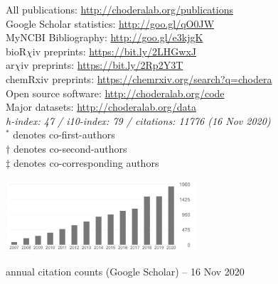 \documentclass[10pt]{article}
\begin{document}
\begin{minipage}[t]{3.2in}
All publications: \href{http://choderalab.org/publications}{http://choderalab.org/publications} \\
Google Scholar statistics: \href{http://goo.gl/qO0JW}{http://goo.gl/qO0JW} \hspace{0.2in} \\
MyNCBI Bibliography: \href{http://goo.gl/e3kjgK}{http://goo.gl/e3kjgK} \\
bioR$\chi$iv preprints: \href{https://bit.ly/2LHGwxJ}{https://bit.ly/2LHGwxJ} \\
ar$\chi$iv preprints: \href{https://bit.ly/2Rp2Y3T}{https://bit.ly/2Rp2Y3T} \\
chemRxiv preprints: \href{https://chemrxiv.org/search?q=chodera}{https://chemrxiv.org/search?q=chodera} \\
Open source software: \href{http://choderalab.org/code}{http://choderalab.org/code}\\
Major datasets: \href{http://choderalab.org/data}{http://choderalab.org/data} \\
{\small \it h-index: 47 / i10-index: 79 / citations: 11776 (16 Nov 2020)} \\
{\scriptsize $^*$ denotes co-first-authors \\
$\dag$ denotes co-second-authors \\
$\ddag$ denotes co-corresponding authors}
\end{minipage}
\quad
\begin{minipage}[t]{3in}

\includegraphics[width=2.8in,valign=t]{thumbnails/citations-2020-11-16.pdf}

\vspace{0.05in}
{\small annual citation counts (Google Scholar) -- 16 Nov 2020}
\end{minipage}



\end{document}
